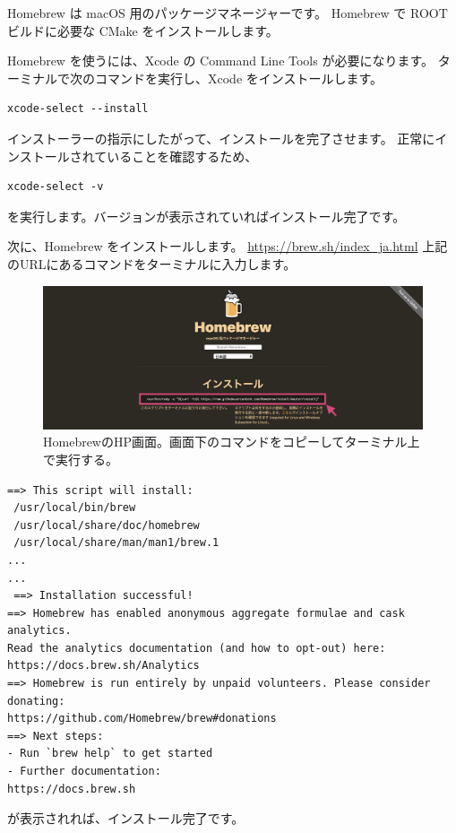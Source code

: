 \documentclass[10pt]{ujarticle}
\begin{document}
Homebrew は macOS 用のパッケージマネージャーです。
Homebrew で ROOT ビルドに必要な CMake をインストールします。\par
Homebrew を使うには、Xcode の Command Line Tools が必要になります。
ターミナルで次のコマンドを実行し、Xcode をインストールします。
\begin{lstlisting}
xcode-select --install
\end{lstlisting}
インストーラーの指示にしたがって、インストールを完了させます。
正常にインストールされていることを確認するため、
\begin{lstlisting}
xcode-select -v
\end{lstlisting}
を実行します。バージョンが表示されていればインストール完了です。\par
次に、Homebrew をインストールします。
\url{https://brew.sh/index_ja.html}
上記のURLにあるコマンドをターミナルに入力します。
\begin{figure}[h]
\begin{center}
\includegraphics[width=14cm]{Homebrew.png}
\caption{HomebrewのHP画面。画面下のコマンドをコピーしてターミナル上で実行する。}
\end{center}
\end{figure}
\begin{lstlisting}[caption=Homebrewインストール時のスクリプト]
==> This script will install:
 /usr/local/bin/brew
 /usr/local/share/doc/homebrew
 /usr/local/share/man/man1/brew.1
...
...
 ==> Installation successful!
==> Homebrew has enabled anonymous aggregate formulae and cask analytics.
Read the analytics documentation (and how to opt-out) here:
https://docs.brew.sh/Analytics
==> Homebrew is run entirely by unpaid volunteers. Please consider donating:
https://github.com/Homebrew/brew#donations
==> Next steps:
- Run `brew help` to get started
- Further documentation:
https://docs.brew.sh
\end{lstlisting}

が表示されれば、インストール完了です。\par
\end{document}
